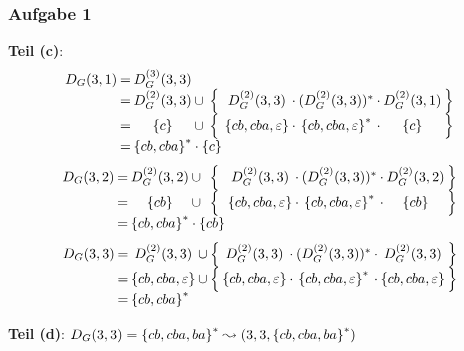 \documentclass{beamer}
\begin{document}
\begin{frame} \frametitle{Aufgabe 1}
	\small
	\textbf{Teil (c)}:
	\begin{equation*}
	\setlength{\arraycolsep}{1pt}
		\begin{array}{rcccccccccc}
			D_G(3,1) &=& D_G^{(3)}(3,3) \\
			&=& D_G^{(2)}(3,3) &\cup& \Big\{ & D_G^{(2)}(3,3) &\cdot& (D_G^{(2)}(3,3))^\ast &\cdot& D_G^{(2)}(3,1) & \Big\}\\
			&=& \menge{c} &\cup& \Big\{ & \menge{cb,cba,\epsilon} &\cdot& \menge{cb,cba,\epsilon}^\ast &\cdot& \menge{c} & \Big\} \\
			&=& \multicolumn{3}{l}{\menge{cb,cba}^\ast \cdot \menge{c}}
		\end{array}
	\end{equation*}
	\pause
	\begin{equation*}
	\setlength{\arraycolsep}{1pt}
		\begin{array}{rcccccccccc}
		D_G(3,2)
		&=& D_G^{(2)}(3,2) &\cup& \Big\{ & D_G^{(2)}(3,3) &\cdot& (D_G^{(2)}(3,3))^\ast &\cdot& D_G^{(2)}(3,2) & \Big\}\\
		&=& \menge{cb} &\cup& \Big\{ & \menge{cb,cba,\epsilon} &\cdot& \menge{cb,cba,\epsilon}^\ast &\cdot& \menge{cb} & \Big\} \\
		&=& \multicolumn{3}{l}{\menge{cb,cba}^\ast \cdot \menge{cb}}
		\end{array}
	\end{equation*}
	\pause
	\begin{equation*}
	\setlength{\arraycolsep}{1pt}
		\begin{array}{rcccccccccc}
		D_G(3,3)
		&=& D_G^{(2)}(3,3) &\cup& \Big\{ & D_G^{(2)}(3,3) &\cdot& (D_G^{(2)}(3,3))^\ast &\cdot& D_G^{(2)}(3,3) & \Big\}\\
		&=& \menge{cb, cba, \epsilon} &\cup& \Big\{ & \menge{cb,cba,\epsilon} &\cdot& \menge{cb,cba,\epsilon}^\ast &\cdot& \menge{cb, cba, \epsilon} & \Big\} \\
		&=& \multicolumn{3}{l}{\menge{cb,cba}^\ast}
		\end{array}
	\end{equation*}
	
	\pause
	
	\textbf{Teil (d)}:  $D_G(3,3) = \left\{ cb, cba, ba \right\}^\ast \leadsto (3,3, \left\{ cb, cba, ba \right\}^\ast)$
\end{frame}
\end{document}
